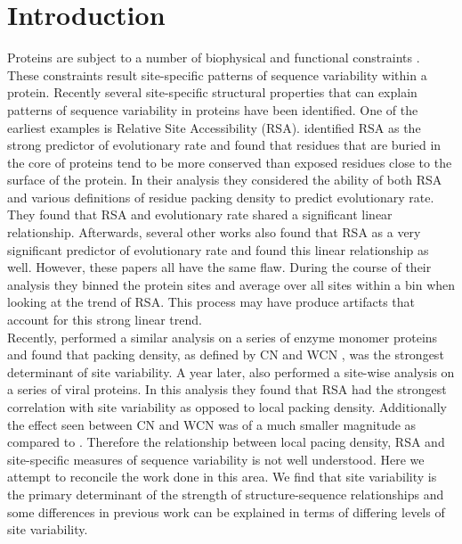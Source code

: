 \documentclass[12pt]{article}
\begin{document}
\section{Introduction}
\label{sec:intro}

Proteins are subject to a number of biophysical and functional constraints \citep{Scherreretal2012, Wilkeetal2010}. These constraints result site-specific patterns of sequence variability within a protein. Recently several site-specific structural properties that can explain patterns of sequence variability in proteins have been identified. One of the earliest examples is Relative Site Accessibility (RSA). \cite{Fransozaetal2009} identified RSA as the strong predictor of evolutionary rate and found that residues that are buried in the core of proteins tend to be more conserved than exposed residues close to the surface of the protein. In their analysis they considered the ability of both RSA and various definitions of residue packing density to predict evolutionary rate. They found that RSA and evolutionary rate shared a significant linear relationship. Afterwards, several other works \citep{Ramseyetal2011, Scherreretal2012} also found that RSA as a very significant predictor of evolutionary rate and found this linear relationship as well. However, these papers all have the same flaw. During the course of their analysis they binned the protein sites and average over all sites within a bin when looking at the trend of RSA. This process may have produce artifacts that account for this strong linear trend. \\
\indent Recently, \cite{Yehetal2014} performed a similar analysis on a series of enzyme monomer proteins and found that packing density, as defined by CN and WCN \citep{Liaoetal2005, Yehetal2014, Huangetal2014}, was the strongest determinant of site variability.  A year later, \cite{Shahmoradietal2014} also performed a site-wise analysis on a series of viral proteins. In this analysis they found that RSA had the strongest correlation with site variability as opposed to local packing density. Additionally the effect seen between CN and WCN was of a much smaller magnitude as compared to \citep{Yehetal2014}. Therefore the relationship between local pacing density, RSA and site-specific measures of sequence variability is not well understood. Here we attempt to reconcile the work done in this area. We find that site variability is the primary determinant of the strength of structure-sequence relationships and some differences in previous work can be explained in terms of differing levels of site variability. \\
\end{document}
